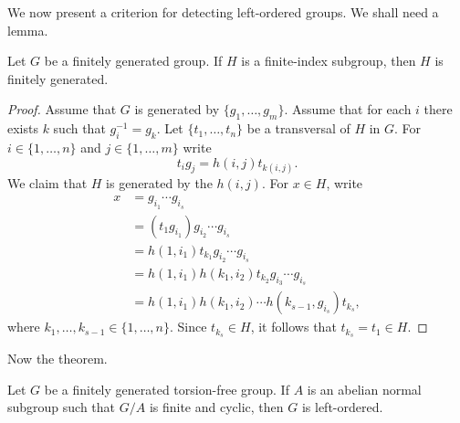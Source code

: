 %

We now present a criterion for detecting left-ordered groups. We shall need 
a lemma. 

\begin{lemma}
	\label{lem:fg}
	Let $G$ be a finitely generated group. If $H$ is a finite-index subgroup, 
	then $H$ is finitely generated. 
\end{lemma}

\begin{proof}
	Assume that $G$ is generated by $\{g_1,\dots,g_m\}$. Assume that
	for each $i$ there exists $k$ such that $g_i^{-1}=g_k$. Let $\{t_1,\dots,t_n\}$ be
	a transversal of $H$ in $G$. For $i\in\{1,\dots,n\}$ and 
	$j\in\{1,\dots,m\}$ write 
	\[
		t_ig_j=h(i,j)t_{k(i,j)}.
	\]
	We claim that $H$ is generated by the $h(i,j)$. For $x\in H$, write 
	\begin{align*}
	x &=g_{i_1}\cdots g_{i_s}\\
	&= (t_1g_{i_1})g_{i_2}\cdots g_{i_s}\\
	&= h(1,i_1)t_{k_1}g_{i_2}\cdots g_{i_s}\\
	&= h(1,i_1)h(k_1,i_2)t_{k_2}g_{i_3}\cdots g_{i_s}\\
	&= h(1,i_1)h(k_1,i_2)\cdots h(k_{s-1},g_{i_s})t_{k_s},
	\end{align*}
	where $k_1,\dots,k_{s-1}\in\{1,\dots,n\}$. Since $t_{k_s}\in H$, it follows that 
	$t_{k_s}=t_1\in H$.
\end{proof}

Now the theorem.

\begin{theorem}
	Let $G$ be a finitely generated torsion-free group. If $A$ is an abelian normal
	subgroup such that $G/A$ is finite and cyclic, then $G$ is left-ordered. 
\end{theorem}


